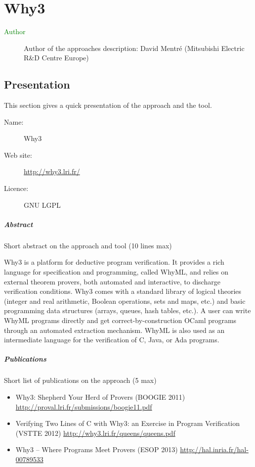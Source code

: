 \chapter{Why3}

\begin{description}
\item[\textcolor{green}{Author}] Author of the approaches description: David Mentré (Mitsubishi Electric R\&D Centre
Europe)
\end{description}


\section{Presentation}

This section gives a quick presentation of the approach and the tool.

\begin{description}
\item[Name:] Why3
\item[Web site: ] \url{http://why3.lri.fr/}
\item[Licence: ] GNU LGPL
\end{description}

\paragraph{Abstract} Short abstract on the approach and tool (10 lines max)

Why3 is a platform for deductive program verification. It provides a
rich language for specification and programming, called WhyML, and
relies on external theorem provers, both automated and interactive, to
discharge verification conditions. Why3 comes with a standard library
of logical theories (integer and real arithmetic, Boolean operations,
sets and maps, etc.) and basic programming data structures (arrays,
queues, hash tables, etc.). A user can write WhyML programs directly
and get correct-by-construction OCaml programs through an automated
extraction mechanism. WhyML is also used as an intermediate language
for the verification of C, Java, or Ada programs.



\paragraph{Publications} Short list of publications on the approach (5 max)

\begin{itemize}
	\item Why3: Shepherd Your Herd of Provers (BOOGIE 2011)
\url{http://proval.lri.fr/submissions/boogie11.pdf}

\item Verifying Two Lines of C with Why3: an Exercise in Program Verification (VSTTE 2012)
\url{http://why3.lri.fr/queens/queens.pdf}

\item Why3 -- Where Programs Meet Provers  (ESOP 2013)
\url{http://hal.inria.fr/hal-00789533}

\end{itemize}

